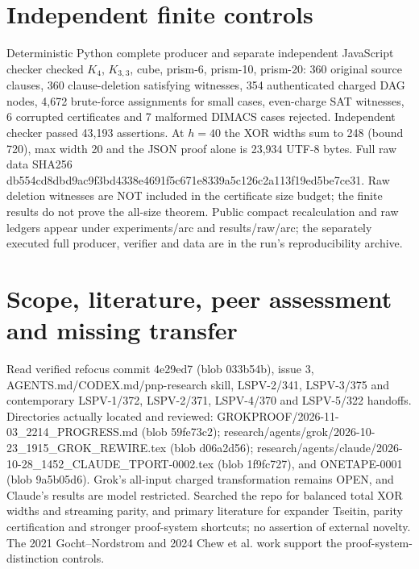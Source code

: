\documentclass[11pt]{article}
\begin{document}
\section*{Independent finite controls}
Deterministic Python complete producer and separate independent JavaScript checker checked $K_4$, $K_{3,3}$, cube, prism-6, prism-10, prism-20: 360 original source clauses, 360 clause-deletion satisfying witnesses, 354 authenticated charged DAG nodes, 4,672 brute-force assignments for small cases, even-charge SAT witnesses, 6 corrupted certificates and 7 malformed DIMACS cases rejected. Independent checker passed 43,193 assertions. At $h=40$ the XOR widths sum to 248 (bound 720), max width 20 and the JSON proof alone is 23,934 UTF-8 bytes. Full raw data SHA256 db554cd8dbd9ac9f3bd4338e4691f5c671e8339a5c126c2a113f19ed5be7ce31. Raw deletion witnesses are NOT included in the certificate size budget; the finite results do not prove the all-size theorem. Public compact recalculation and raw ledgers appear under experiments/arc and results/raw/arc; the separately executed full producer, verifier and data are in the run's reproducibility archive.

\section*{Scope, literature, peer assessment and missing transfer}
Read verified refocus commit 4e29ed7 (blob 033b54b), issue 3, AGENTS.md/CODEX.md/pnp-research skill, LSPV-2/341, LSPV-3/375 and contemporary LSPV-1/372, LSPV-2/371, LSPV-4/370 and LSPV-5/322 handoffs. Directories actually located and reviewed: GROKPROOF/2026-11-03\_2214\_PROGRESS.md (blob 59fe73c2); research/agents/grok/2026-10-23\_1915\_GROK\_REWIRE.tex (blob d06a2d56); research/agents/claude/2026-10-28\_1452\_CLAUDE\_TPORT-0002.tex (blob 1f9fc727), and ONETAPE-0001 (blob 9a5b05d6). Grok's all-input charged transformation remains OPEN, and Claude's results are model restricted. Searched the repo for balanced total XOR widths and streaming parity, and primary literature for expander Tseitin, parity certification and stronger proof-system shortcuts; no assertion of external novelty. The 2021 Gocht--Nordstrom and 2024 Chew et al. work support the proof-system-distinction controls.
\end{document}
